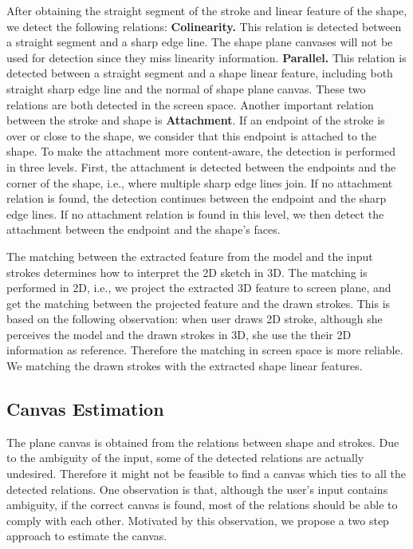 %
After obtaining the straight segment of the stroke and linear feature of the shape, we detect the following relations: \textbf{Colinearity.} This relation is detected between a straight segment and a sharp edge line. The shape plane canvases will not be used for detection since they miss linearity information. \textbf{Parallel.} This relation is detected between a straight segment and a shape linear feature, including both straight sharp edge line and the normal of shape plane canvas. These two relations are both detected in the screen space. Another important relation between the stroke and shape is \textbf{Attachment}. If an endpoint of the stroke is over or close to the shape, we consider that this endpoint is attached to the shape. To make the attachment more content-aware, the detection is performed in three levels. First, the attachment is detected between the endpoints and the corner of the shape, i.e., where multiple sharp edge lines join. If no attachment relation is found, the detection continues between the endpoint and the sharp edge lines. If no attachment relation is found in this level, we then detect the attachment between the endpoint and the shape's faces.


The matching between the extracted feature from the model and the input strokes determines how to interpret the 2D sketch in 3D. The matching is performed in 2D, i.e., we project the extracted 3D feature to screen plane, and get the matching between the projected feature and the drawn strokes. This is based on the following observation: when user draws 2D stroke, although she perceives the model and the drawn strokes in 3D, she use the their 2D information as reference. Therefore the matching in screen space is more reliable. We matching the drawn strokes with the extracted shape linear features.


\subsection{Canvas Estimation}
The plane canvas is obtained from the relations between shape and strokes. Due to the ambiguity of the input, some of the detected relations are actually undesired. Therefore it might not be feasible to find a canvas which ties to all the detected relations. One observation is that, although the user's input contains ambiguity, if the correct canvas is found, most of the relations should be able to comply with each other. Motivated by this observation, we propose a two step approach to estimate the canvas.

